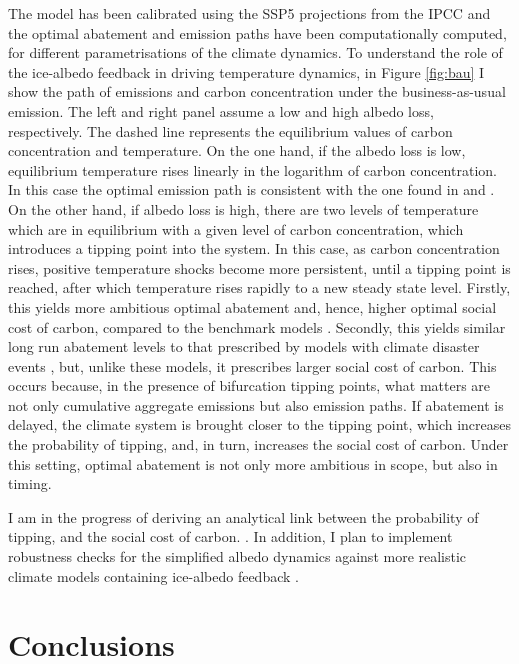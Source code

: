 \documentclass[12pt]{article}
\begin{document}
The model has been calibrated using the SSP5 projections from the IPCC \citep{kriegler_fossil-fueled_2017} and the optimal abatement and emission paths have been computationally computed, for different parametrisations of the climate dynamics. To understand the role of the ice-albedo feedback in driving temperature dynamics, in Figure \ref{fig:bau} I show the path of emissions and carbon concentration under the business-as-usual emission. The left and right panel assume a low and high albedo loss, respectively. The dashed line represents the equilibrium values of carbon concentration and temperature. On the one hand, if the albedo loss is low, equilibrium temperature rises linearly in the logarithm of carbon concentration. In this case the optimal emission path is consistent with the one found in \cite{nordhaus_revisiting_2017} and \cite{hambel_optimal_2021}. On the other hand, if albedo loss is high, there are two levels of temperature which are in equilibrium with a given level of carbon concentration, which introduces a tipping point into the system. In this case, as carbon concentration rises, positive temperature shocks become more persistent, until a tipping point is reached, after which temperature rises rapidly to a new steady state level. Firstly, this yields more ambitious optimal abatement and, hence, higher optimal social cost of carbon, compared to the benchmark models \citep{nordhaus_revisiting_2017,hambel_optimal_2021}. Secondly, this yields similar long run abatement levels to that prescribed by models with climate disaster events \citep{van_den_bremer_risk-adjusted_2021,dietz_economic_2021, lin_social_2023}, but, unlike these models, it prescribes larger social cost of carbon. This occurs because, in the presence of bifurcation tipping points, what matters are not only cumulative aggregate emissions but also emission paths. If abatement is delayed, the climate system is brought closer to the tipping point, which increases the probability of tipping, and, in turn, increases the social cost of carbon. Under this setting, optimal abatement is not only more ambitious in scope, but also in timing. 

I am in the progress of deriving an analytical link between the probability of tipping, and the social cost of carbon. \citep{grass_small-noise_2015}. In addition, I plan to implement robustness checks for the  simplified albedo dynamics against more realistic climate models containing ice-albedo feedback \citep{seaver_wang_mechanisms_2023}.

\section{Conclusions}
\end{document}
